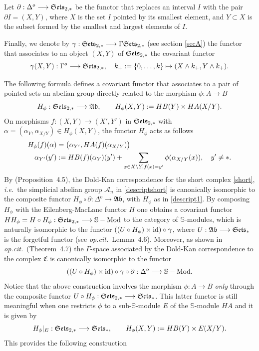 \documentclass[cupthm]{CUP-JNL-JMJ}
\numberwithin{equation}{section}
\theoremstyle{cupplain}
\theoremstyle{cupdefinition}
\theoremstyle{cupremark}
\theoremstyle{cupproof}
\def\S{{\mathbb S}}
\def\sss{{\S}}
\def\Se{\frak{ Sets}}
\def\Ses{{\Se_*}}
\def\id{{\rm id}}
\def\dop{{\Delta^o}}
\def\crel{{\Se_{2,*}}}
\def\gop{{\Gamma^{o}}}
\def\Ab{\mathfrak{ Ab}}
\def\smod{{\sss-{\rm{Mod}}}}
\newcommand{\ie}{{\it i.e.\/}\ }
\newcommand{\opcit}{{\it op.cit.\/}\ }
\begin{document}
\begin{appendix}
Let  $\partial:\dop\longrightarrow \crel $ be the functor that  replaces an interval $I$ with the pair $\partial I=(X,Y)$, where $X$ is the set $I$ pointed by its smallest element, and $Y\subset X$ is the subset formed by the smallest and largest elements of $I$.

Finally, we denote by $\gamma:\crel \longrightarrow\Gamma\crel$ (see section \ref{secA}) the functor that associates to an object $(X,Y)$ of $\crel$ the covariant functor
\[
\gamma(X,Y):\gop\longrightarrow \crel,\quad k_+:=\{0,\ldots,k\}\mapsto (X\wedge k_+,Y\wedge k_+).
\]
\vspace{.01in}

  The following formula defines a covariant functor that associates to a pair of pointed sets  an abelian group directly related to the morphism $\phi: A\to B$
 \begin{equation}\label{descript1}
  H_\phi:\crel\longrightarrow \Ab,  \qquad	H_\phi(X,Y):=HB(Y)\times HA(X/Y).
 \end{equation}
 On morphisms	$f:(X,Y)\to (X',Y')$  in $\crel$ with $\alpha= (\alpha_Y,\alpha_{X/Y})\in H_\phi(X,Y)$,  the functor $H_\phi$ acts as follows
 \begin{align}\label{descript2}
 	H_\phi(f)(\alpha)&=\left(\alpha_{Y'}, HA(f)(\alpha_{X/Y})\right) \\\notag  \alpha_{Y'}(y')&:=HB(f)(\alpha_{Y})(y')+\sum_{x\in X\setminus Y, f(x)=y'}\phi(\alpha_{X/Y}(x)),\quad y'\neq *.\notag
 \end{align}
   By \cite{CCAtiyah} (Proposition~4.5), the Dold-Kan correspondence for the short complex \eqref{short}, \ie  the simplicial abelian group $\mathcal A_n$  in  \eqref{descriptshort}   is canonically isomorphic    to the composite functor $H_\phi\circ \partial: \dop\longrightarrow \Ab$, with $H_\phi$ as in \eqref{descript1}. 
  By composing $H_\phi$  with the Eilenberg-MacLane functor $H$ one obtains  a covariant functor $HH_\phi=H\circ H_\phi :\crel\longrightarrow \smod$  to the category of $\sss$-modules,  which is naturally isomorphic  to the functor $((U\circ H_\phi)\times \id)\circ \gamma$, where $U:\Ab\longrightarrow \Ses$ is the forgetful functor (see \opcit Lemma~4.6). Moreover, as shown in \opcit (Theorem~4.7)  the $\Gamma$-space associated by the Dold-Kan correspondence to the complex $\mathfrak C$ is canonically isomorphic  to the functor 
 \begin{equation}\label{gammasp}((U\circ H_\phi)\times \id)\circ \gamma\circ \partial : \dop \longrightarrow \smod.
\end{equation}
  Notice  that the above construction  involves the morphism $\phi:A\to B$  {\em only} through  the composite functor $U\circ H_\phi:\crel \longrightarrow \Ses$. This latter functor  is still meaningful  when one restricts $\phi$ to a sub-$\sss$-module  $E$    of the $\sss$-module $HA$ and it is given by 
  \begin{equation}\label{descript1sub}
   H_\phi\vert_E:\crel\longrightarrow \Ses,  \qquad	H_\phi(X,Y):=HB(Y)\times E(X/Y).
 \end{equation} 
 This  provides the following construction 
 

\end{appendix}
\end{document}
